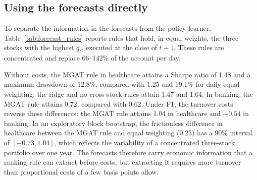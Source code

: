 \documentclass[pdflatex,sn-mathphys-num]{sn-jnl}%
\theoremstyle{thmstyleone}%
\theoremstyle{thmstyletwo}%
\theoremstyle{thmstylethree}%
\begin{document}
\subsection{Using the forecasts directly}\label{subsec:rules}

{\color{blue}To separate the information in the forecasts from the policy learner, Table~\ref{tab:forecast_rules} reports rules that hold, in equal weights, the three stocks with the highest $\hat q_t$, executed at the close of $t+1$. These rules are concentrated and replace 66--142\% of the account per day.

Without costs, the MGAT rule in healthcare attains a Sharpe ratio of 1.48 and a maximum drawdown of 12.8\%, compared with 1.25 and 19.1\% for daily equal weighting; the ridge and no-cross-stock rules attain 1.47 and 1.64. In banking, the MGAT rule attains 0.72, compared with 0.62. Under F1, the turnover costs reverse these differences: the MGAT rule attains 1.04 in healthcare and $-0.54$ in banking. In an exploratory block bootstrap, the frictionless difference in healthcare between the MGAT rule and equal weighting (0.23) has a 90\% interval of $[-0.73, 1.04]$, which reflects the variability of a concentrated three-stock portfolio over one year. The forecasts therefore carry economic information that a ranking rule can extract before costs, but extracting it requires more turnover than proportional costs of a few basis points allow.\par}
\end{document}
